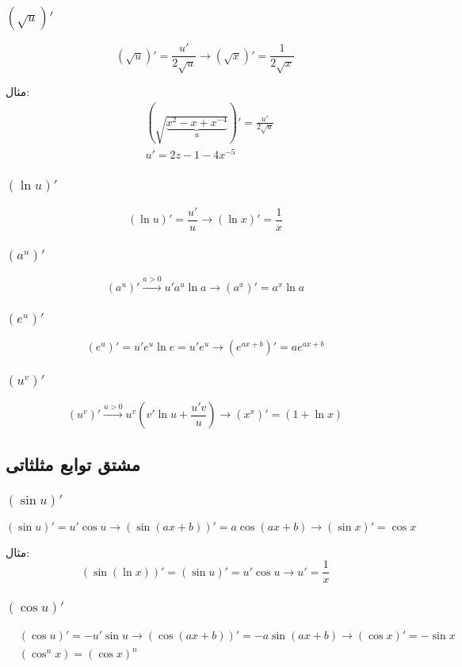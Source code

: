 \subsubsection{$(\sqrt{u})'$}
\[ (\sqrt{u})' = \frac{u'}{2\sqrt{u}} \to (\sqrt{x})' = \frac{1}{2\sqrt{x}} \]

مثال:
\begin{align*}
&(\sqrt{\underbrace{x^2-x+x^{-4}}_u})' = \frac{u'}{2\sqrt{u}} \\
&u' = 2z-1-4x^{-5}
\end{align*}

\subsubsection{$(\ln u)'$}
\[ (\ln u)' = \frac{u'}{u} \to (\ln x)' = \frac{1}{x} \]

\subsubsection{$(a^u)'$}
\[ (a^u)' \overset{a>0}{\longrightarrow} u'a^u\ln a \to (a^x)' = a^x\ln a \]

\subsubsection{$(e^u)'$}
\[ (e^u)' = u'e^u\ln e = u'e^u \to (e^{ax+b})' = ae^{ax+b} \]

\subsubsection{$(u^v)'$}
\[ (u^v)' \overset{u>0}{\longrightarrow} u^v(v'\ln u+\frac{u'v}{u}) \to (x^x)' = (1 + \ln x) \]


\subsection{مشتق توابع مثلثاتی}
\subsubsection{$(\sin u)'$}
\[ (\sin u)' = u'\cos u \longrightarrow (\sin(ax+b))' = a \cos(ax+b) \longrightarrow (\sin x)' = \cos x \]

مثال:
\[ (\sin(\ln x))' = (\sin u)' = u'\cos u \to u' = \frac{1}{x}\]

\subsubsection{$(\cos u)'$}
\begin{align*}
&(\cos u)' = -u'\sin u \longrightarrow (\cos(ax+b))' = -a\sin(ax+b) \to (\cos x)' = -\sin x \\
&(\cos^n x) = (\cos x)^n \\
\end{align*}

